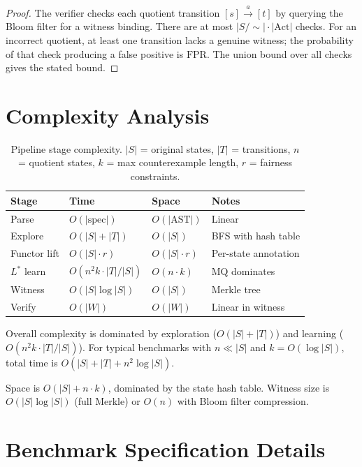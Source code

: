 \documentclass[11pt]{article}
\newcommand{\Act}{\ensuremath{\mathrm{Act}}}
\newcommand{\FPR}{\ensuremath{\mathrm{FPR}}}
\begin{document}
\begin{proof}
The verifier checks each quotient transition $[s] \xrightarrow{a} [t]$
by querying the Bloom filter for a witness binding.
There are at most $|S/{\sim}| \cdot |\Act|$ checks.
For an incorrect quotient, at least one transition lacks a genuine witness;
the probability of that check producing a false positive is $\FPR$.
The union bound over all checks gives the stated bound.
\end{proof}


\section{Complexity Analysis}
\label{app:complexity}

\begin{table}[h]
\centering
\caption{Pipeline stage complexity.
  $|S|$ = original states, $|T|$ = transitions, $n$ = quotient states,
  $k$ = max counterexample length, $r$ = fairness constraints.}
\label{tab:complexity}
\small
\begin{tabular}{@{}llll@{}}
\toprule
\textbf{Stage} & \textbf{Time} & \textbf{Space} & \textbf{Notes} \\
\midrule
Parse        & $O(|\text{spec}|)$  & $O(|\text{AST}|)$  & Linear \\
Explore      & $O(|S| + |T|)$     & $O(|S|)$           & BFS with hash table \\
Functor lift & $O(|S| \cdot r)$   & $O(|S| \cdot r)$   & Per-state annotation \\
$L^*$ learn  & $O(n^2 k \cdot |T|/|S|)$ & $O(n \cdot k)$ & MQ dominates \\
Witness      & $O(|S| \log |S|)$  & $O(|S|)$           & Merkle tree \\
Verify       & $O(|W|)$           & $O(|W|)$           & Linear in witness \\
\bottomrule
\end{tabular}
\end{table}

Overall complexity is dominated by exploration ($O(|S| + |T|)$) and
learning ($O(n^2 k \cdot |T|/|S|)$).
For typical benchmarks with $n \ll |S|$ and $k = O(\log |S|)$, total
time is $O(|S| + |T| + n^2 \log |S|)$.

Space is $O(|S| + n \cdot k)$, dominated by the state hash table.
Witness size is $O(|S| \log |S|)$ (full Merkle) or $O(n)$ with Bloom
filter compression.


\section{Benchmark Specification Details}
\label{app:benchmarks}
\end{document}
